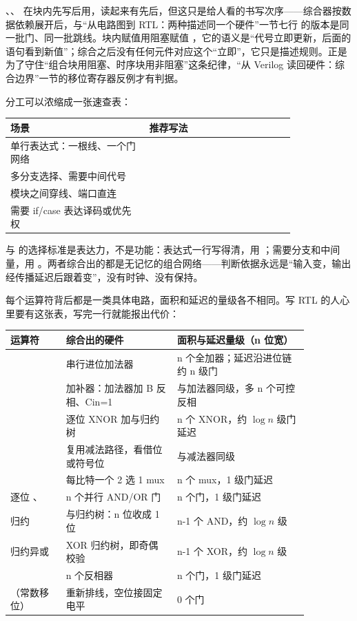 、、 在块内先写后用，读起来有先后，但这只是给人看的书写次序——综合器按数据依赖展开后，与“从电路图到 RTL：两种描述同一个硬件”一节七行  的版本是同一批门、同一批跳线。块内赋值用阻塞赋值 \code{=}，它的语义是“代号立即更新，后面的语句看到新值”；综合之后没有任何元件对应这个“立即”，它只是描述规则。正是为了守住“组合块用阻塞、时序块用非阻塞”这条纪律，“从 Verilog 读回硬件：综合边界”一节的移位寄存器反例才有判据。

分工可以浓缩成一张速查表：

\begin{longtable}{L{0.4\linewidth}L{0.42\linewidth}}
\toprule
场景 & 推荐写法 \\
\midrule
单行表达式：一根线、一个门网络 &  \\\tablerowrule
多分支选择、需要中间代号 &  \\\tablerowrule
模块之间穿线、端口直连 &  \\\tablerowrule
需要 if/case 表达译码或优先权 &  \\
\bottomrule
\end{longtable}

\begin{keyidea}
 与  的选择标准是表达力，不是功能：表达式一行写得清，用 ；需要分支和中间量，用 。两者综合出的都是无记忆的组合网络——判断依据永远是“输入变，输出经传播延迟后跟着变”，没有时钟、没有保持。
\end{keyidea}

每个运算符背后都是一类具体电路，面积和延迟的量级各不相同。写 RTL 的人心里要有这张表，写完一行就能报出代价：

\begin{longtable}{L{0.16\linewidth}L{0.32\linewidth}L{0.38\linewidth}}
\toprule
运算符 & 综合出的硬件 & 面积与延迟量级（n 位宽） \\
\midrule
{} & 串行进位加法器 & n 个全加器；延迟沿进位链约 n 级门 \\\tablerowrule
{} & 加补器：加法器加 B 反相、Cin=1 & 与加法器同级，多 n 个可控反相 \\\tablerowrule
{} & 逐位 XNOR 加与归约树 & n 个 XNOR，约 $\log n$ 级门延迟 \\\tablerowrule
{} & 复用减法路径，看借位或符号位 & 与减法器同级 \\\tablerowrule
{} & 每比特一个 2 选 1 mux & n 个 mux，1 级门延迟 \\\tablerowrule
逐位 \code{\&}、\code{|} & n 个并行 AND/OR 门 & n 个门，1 级门延迟 \\\tablerowrule
归约  & 与归约树：n 位收成 1 位 & n-1 个 AND，约 $\log n$ 级 \\\tablerowrule
归约异或 & XOR 归约树，即奇偶校验 & n-1 个 XOR，约 $\log n$ 级 \\\tablerowrule
{} & n 个反相器 & n 个门，1 级门延迟 \\\tablerowrule
{}（常数移位） & 重新排线，空位接固定电平 & 0 个门 \\
\bottomrule
\end{longtable}

